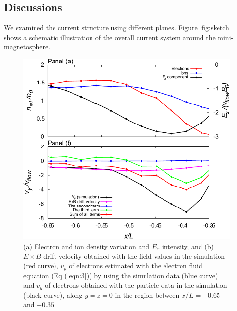 \documentclass[draft,jgrga]{agutex2015}
\begin{document}
\begin{article}
\section{Discussions}
We examined the current structure using different planes.
Figure \ref{fig:sketch} shows a schematic illustration of 
the overall current system around the mini-magnetosphere.

\begin{figure}
\centering
\noindent\includegraphics[width=15cm]{./figures/Fig_8_bb-crop.pdf}
\caption{
(a) Electron and ion density variation and $E_x$ intensity, and 
(b) $E \times B$ drift velocity obtained with the field values in the simulation (red curve), 
    $v_y$ of electrons estimated with the electron fluid equation (Eq (\ref{eqn:3}))
     by using the simulation data (blue curve) and  
    $v_y$ of electrons obtained with the particle data in the simulation (black curve),
  along $y=z=0$ in the region between $x/L = -0.65$ and $-0.35$. } 
\label{fig:8}
\end{figure}


\end{article}
\end{document}
